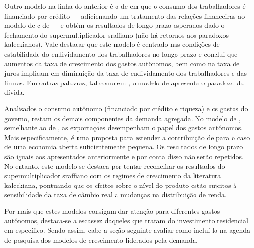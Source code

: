 

Outro modelo na linha do anterior é o de \textcite{mandarino_financing_2018} em que o consumo dos trabalhadores é financiado por crédito --- adicionando um tratamento das relações financeiras ao modelo de \textcite{pariboni_household_2016} e de \textcite{fagundes_dinamica_2017} --- e obtém os resultados de longo prazo esperados dado o fechamento do supermultiplicador sraffiano (não há retornos aos paradoxos kaleckianos).
Vale destacar que este modelo é centrado nas condições de estabilidade do endividamento dos trabalhadores no longo prazo e conclui que aumentos da taxa de crescimento dos gastos autônomos, bem como na taxa de juros implicam em diminuição da taxa de endividamento dos trabalhadores e das firmas. 
Em outras palavras, tal como em \textcite{hein_autonomous_2018}, o modelo de \textcite{mandarino_financing_2018} apresenta o paradoxo da dívida.


Analisados o consumo autônomo (financiado por crédito e riqueza) e os gastos do governo, restam os demais componentes da demanda agregada.
No modelo de \textcite{nah_long-run_2017}, semelhante ao de \textcite{dejuan_hidden_2017}, as exportações desempenham o papel dos gastos autônomos. Mais especificamente, é uma proposta para estender a contribuição de \textcite{serrano_sraffian_1995} para o caso de uma economia aberta suficientemente pequena. Os resultados de longo prazo são iguais aos apresentados anteriormente e por conta disso não serão repetidos. No entanto, este modelo se destaca por tentar reconciliar os resultados do supermultiplicador sraffiano com os regimes de crescimento da literatura kaleckiana, pontuando que os efeitos sobre o nível do produto estão sujeitos à sensibilidade da taxa de câmbio real a mudanças na distribuição de renda. 


Por mais que estes modelos consigam dar atenção para diferentes gastos autônomos, destaca-se a escassez daqueles que tratam do investimento residencial em específico. 
Sendo assim, cabe a seção seguinte avaliar como incluí-lo na agenda de pesquisa dos modelos de crescimento liderados pela demanda.
